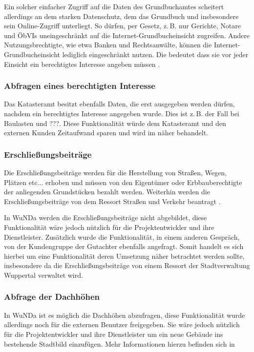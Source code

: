 Ein solcher einfacher Zugriff auf die Daten des Grundbuchamtes scheitert allerdings an dem starken Datenschutz, dem das Grundbuch und insbesondere sein Online-Zugriff unterliegt.
So dürfen, per Gesetz, z.\,B. nur Gerichte, Notare und \acp{ÖbVI} uneingeschränkt auf die Internet-Grundbucheinsicht zugreifen.
Andere Nutzungsbrechtigte, wie etwa Banken und Rechtsanwälte, können die Internet-Grundbucheinsicht lediglich eingeschränkt nutzen.
Die bedeutet dass sie vor jeder Einsicht ein berechtigtes Interesse angeben müssen \autocite[vgl.][]{justiz-grundbucheinsicht}.

 
\subsubsection{Abfragen eines berechtigten Interesse}
Das Katasteramt besitzt ebenfalls Daten, die erst ausgegeben werden dürfen, nachdem ein berechtigtes Interesse angegeben wurde.
Dies ist z.\,B. der Fall bei Baulasten und ???.
Diese Funktionalität würde dem Katasteramt und den externen Kunden Zeitaufwand sparen und wird im  näher behandelt.

\subsubsection{Erschließungsbeiträge}
Die Erschließungsbeiträge werden für die Herstellung von Straßen, Wegen, Plätzen etc... erhoben und müssen von den Eigentümer oder Erbbauberechtigte der anliegenden Grundstücken bezahlt werden.
Weiterhin werden die Erschließungsbeiträge von dem Ressort Straßen und Verkehr beantragt \autocite[vgl.][]{wupp-erschliessungsbeitrag}.

In \ac{WuNDa} werden die Erschließungsbeiträge nicht abgebildet, diese Funktionalität wäre jedoch nützlich für die Projektentwickler und ihre Dienstleister.
Zusätzlich wurde die Funktionalität, in einem anderen Gespräch, von der Kundengruppe der Gutachter ebenfalls angefragt.
Somit handelt es sich hierbei um eine Funktionalität deren Umsetzung näher betrachtet werden sollte, insbesondere da die Erschließungsbeiträge von einem Ressort der Stadtverwaltung Wuppertal verwaltet wird.

\subsubsection{Abfrage der Dachhöhen}
In \ac{WuNDa} ist es möglich die Dachhöhen abzufragen, diese Funktionalität wurde allerdings noch für die externen Benutzer freigegeben.
Sie wäre jedoch nützlich für die Projektentwickler und ihre Dienstleister um ein neue Gebäude ins bestehende Stadtbild einzufügen.
Mehr Informationen hierzu befinden sich in 

